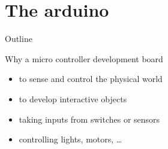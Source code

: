 \section {The arduino}
\begin{frame} {Outline}
    \tableofcontents [current]
\end{frame}

\begin{frame} {Why a micro controller development board}
    \begin{itemize}
		\item to sense and control the physical world
		\item to develop interactive objects
		\item taking inputs from switches or sensors
		\item controlling lights, motors, …
    \end{itemize}
\end{frame}



